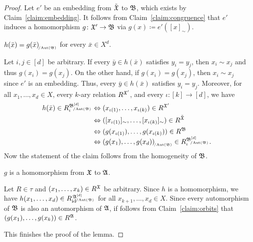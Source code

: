 \begin{proof}
        Let $e'$ be an embedding from $\Tilde{\mathfrak{X}}$ to $\mathfrak{B}$, which exists by Claim~\ref{claim:embedding}.
        It follows from Claim~\ref{claim:congruence} that $e'$ induces a homomorphism $g\colon \mathfrak{X}'\to\mathfrak{B}$ via $g(x) \coloneqq e'([x]_\sim)$.
        \begin{claim} \label{claim:orbits}
            $h(\bar{x})=g(\bar{x})_{\orbeq{\Aut(\struct{B})}}$ for every $\bar{x}\in X^d$.
        \end{claim}
        \begin{claimproof}
         Let $i,j\in [d]$ be arbitrary. 
          If every $\bar{y} \in h(\bar{x})$ satisfies $y_i=y_j$, then $x_i\sim x_j$ and thus $g(x_i)=g(x_j)$.
          On the other hand, if $g(x_i)=g(x_j)$, then $x_i\sim x_j$ since $e'$ is an embedding.
          Thus, every $\bar{y} \in h(\bar{x})$ satisfies $y_i=y_j$.
          Moreover, for all $x_1,\dots,x_d\in X$, every $k$-ary relation $R^{\mathfrak{X}'}$, and every $\iota\colon [k]\to[d]$, we have
        \begin{align*}
            h(\bar{x}) \in R_{\iota}^{\smash{\fpwr{\struct{B}}{d}_{\orbeq{\Aut(\struct{B})}}}} &\Leftrightarrow (x_{\iota(1)},\dots,x_{\iota(k)}) \in R^{\struct{X}'} \\
            &\Leftrightarrow ([x_{\iota(1)}]_\sim,\dots,[x_{\iota(k)}]_\sim) \in R^{\Tilde{\struct{X}}} \\
            &\Leftrightarrow (g(x_{\iota(1)}),\dots, g(x_{\iota(k)})) \in R^{\struct{B}} \\
            &\Leftrightarrow (g(x_1),\dots, g(x_d))_{\orbeq{\Aut(\struct{B})}} \in R_{\iota}^{\smash{\fpwr{\struct{B}}{d}_{\orbeq{\Aut(\struct{B})}}}}. 
        \end{align*}
        Now the statement of the claim follows from the homogeneity of $\mathfrak{B}$.
        \end{claimproof} 

      

       \begin{claim}
           $g$ is a homomorphism from $\mathfrak{X}$ to $\mathfrak{A}$.
       \end{claim}
        \begin{claimproof}
            Let $R\in \tau$ and $(x_1,\dots,x_k)\in R^{\mathfrak{X}}$ be arbitrary.
        Since $h$ is a homomorphism, we have $ h(x_1,\dots,x_d) \in R_{\mathrm{id}}^{\,\smash{\fpwr{\struct{A}}{d}_{\orbeq{\Aut(\struct{B})}}}} $ for all $x_{k+1},\dots,x_d\in X$. 
        Since every automorphism of $\mathfrak{B}$ is also an automorphism of $\mathfrak{A}$, if follows from Claim~\ref{claim:orbits} that $(g(x_1),\dots,g(x_k))\in R^{\mathfrak{A}} $.
        \end{claimproof} 
         This finishes the proof of the lemma.
    \end{proof}


